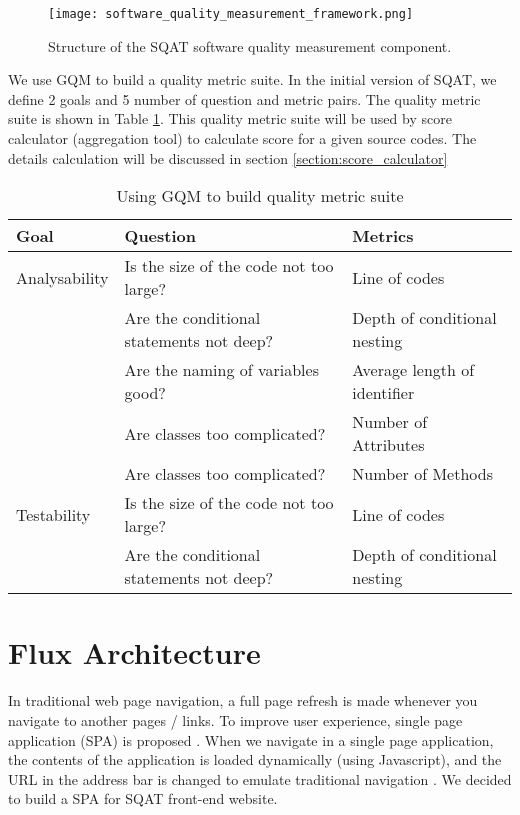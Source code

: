 \begin{figure}[t]
    \centering
    \texttt{[image: software\_quality\_measurement\_framework.png]}
    \caption{Structure of the SQAT software quality measurement component.}
    \label{figure:software_quality_framework}
\end{figure}

We use GQM to build a quality metric suite. In the initial version of SQAT, we define 2 goals and 5 number of question and metric pairs. The quality metric suite is shown in Table \ref{table:gqm}. This quality metric suite will be used by score calculator (aggregation tool) to calculate score for a given source codes. The details calculation will be discussed in section \ref{section:score_calculator}

\begin{table}
\centering
\begin{tabular}{| l | p{6cm}| p{4cm} |}
    \hline
    Goal & Question & Metrics \\
    \hline
    Analysability & Is the size of the code not too large? & Line of codes \\
    & Are the conditional statements not deep? & Depth of conditional nesting \\
    & Are the naming of variables good? & Average length of identifier \\
    & Are classes too complicated? & Number of Attributes \\
    & Are classes too complicated? & Number of Methods \\
    \hline
    Testability & Is the size of the code not too large? & Line of codes \\
    & Are the conditional statements not deep? & Depth of conditional nesting \\
    \hline
\end{tabular}
\caption{Using GQM to build quality metric suite}
\label{table:gqm}
\end{table} 

\section{Flux Architecture} \label{section:flux_architecture}

In traditional web page navigation, a full page refresh is made whenever you navigate to another pages / links. To improve user experience, single page application (SPA) is proposed \cite[]{mesbah2007migrating}. When we navigate in a single page application, the contents of the application is loaded dynamically (using Javascript), and the URL in the address bar is changed to emulate traditional navigation \cite[]{mikowski2013single}. We decided to build a SPA for SQAT front-end website. 

